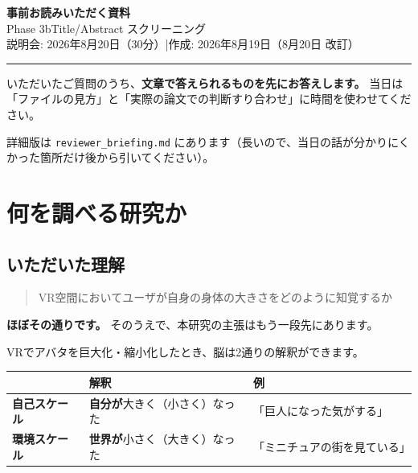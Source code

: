 \documentclass[a4paper]{ltjsarticle}
\begin{document}
\begin{center}
  {\LARGE\bfseries\color{accent} 事前お読みいただく資料}\\[4pt]
  {\large Phase 3b\quad Title/Abstract スクリーニング}\\[10pt]
  {\small 説明会: 2026年8月20日（30分）\quad|\quad 作成: 2026年8月19日（8月20日 改訂）}
\end{center}

\vspace{4pt}
\noindent\textcolor{rule}{\rule{\linewidth}{0.8pt}}
\vspace{6pt}

\noindent
いただいたご質問のうち、\textbf{文章で答えられるものを先にお答えします。}
当日は「ファイルの見方」と「実際の論文での判断すり合わせ」に時間を使わせてください。

\noindent
詳細版は \texttt{reviewer\_briefing.md} にあります（長いので、当日の話が分かりにくかった箇所だけ後から引いてください）。

\section{何を調べる研究か}

\subsection*{いただいた理解}

\begin{quote}
VR空間においてユーザが自身の身体の大きさをどのように知覚するか
\end{quote}

\noindent
\textbf{ほぼその通りです。} そのうえで、本研究の主張はもう一段先にあります。

\medskip
\noindent
VRでアバタを巨大化・縮小化したとき、脳は2通りの解釈ができます。

\begin{center}
\begin{tabularx}{\linewidth}{L{7em} L{13em} X}
\toprule
 & 解釈 & 例 \\
\midrule
\textbf{自己スケール} & \textbf{自分が}大きく（小さく）なった & 「巨人になった気がする」 \\
\textbf{環境スケール} & \textbf{世界が}小さく（大きく）なった & 「ミニチュアの街を見ている」 \\
\bottomrule
\end{tabularx}
\end{center}
\end{document}
